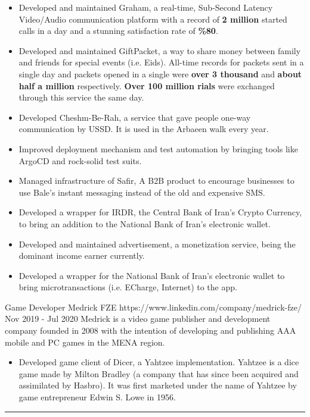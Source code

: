 \documentclass[a4paper,20pt]{article}
\begin{document}
\begin{minipage}[t]{0.65\textwidth}
{    \begin{itemize}[leftmargin=.5cm]
      \item \justifying\small Developed and maintained Graham, a real-time, Sub-Second Latency Video/Audio communication platform with a record of \textbf{2 million} started calls in a day and a stunning satisfaction rate of \textbf{\%80}.
      \item \justifying\small Developed and maintained GiftPacket, a way to share money between family and friends for special events (i.e. Eids). All-time records for packets sent in a single day and packets opened in a single were \textbf{over 3 thousand} and \textbf{about half a million} respectively. \textbf{Over 100 million rials} were exchanged through this service the same day.
      \item \justifying\small Developed Cheshm-Be-Rah, a service that gave people one-way communication by USSD. It is used in the Arbaeen walk every year.
      \item \justifying\small Improved deployment mechanism and test automation by bringing tools like ArgoCD and rock-solid test suits.
      \item \justifying\small Managed infrastructure of Safir, A B2B product to encourage businesses to use Bale's instant messaging instead of the old and expensive SMS.
      \item \justifying\small Developed a wrapper for IRDR, the Central Bank of Iran's Crypto Currency, to bring an addition to the National Bank of Iran's electronic wallet.
      \item \justifying\small Developed and maintained advertisement, a monetization service, being the dominant income earner currently.
      \item \justifying\small Developed a wrapper for the National Bank of Iran's electronic wallet to bring microtransactions (i.e. ECharge, Internet) to the app.
  \end{itemize}

  \expheadingwithlink
    {Game Developer}
    {Medrick FZE}
    {https://www.linkedin.com/company/medrick-fze/}
    {Nov 2019 - Jul 2020}
    {Medrick is a video game publisher and development company founded in 2008 with the intention of developing and publishing AAA mobile and PC games in the MENA region.}

    \begin{itemize}[leftmargin=.5cm]
      \item \justifying\small Developed game client of Dicer, a Yahtzee implementation. Yahtzee is a dice game made by Milton Bradley (a company that has since been acquired and assimilated by Hasbro). It was first marketed under the name of Yahtzee by game entrepreneur Edwin S. Lowe in 1956.
    \end{itemize}
  }
\end{minipage}

\vspace{-1pt}
\rule{\textwidth}{1pt}
\end{document}
